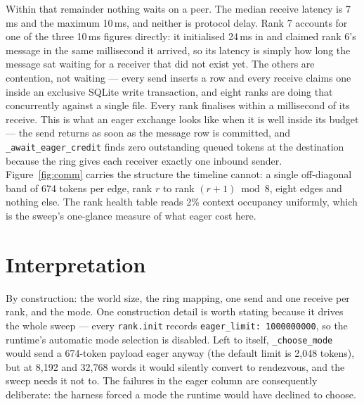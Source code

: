 \documentclass[11pt]{article}
\begin{document}
Within that remainder nothing waits on a peer. The median receive latency is 7\,ms
and the maximum 10\,ms, and neither is protocol delay. Rank 7 accounts for one of the
three 10\,ms figures directly: it initialised 24\,ms in and claimed rank 6's message
in the same millisecond it arrived, so its latency is simply how long the message sat
waiting for a receiver that did not exist yet. The others are contention, not
waiting --- every send inserts a row and every receive claims one inside an exclusive
SQLite write transaction, and eight ranks are doing that concurrently against a
single file. Every rank finalises within a millisecond of its receive. This is what
an eager exchange looks like when
it is well inside its budget --- the send returns as soon as the message row is
committed, and \texttt{\_await\_eager\_credit} finds zero outstanding queued tokens
at the destination because the ring gives each receiver exactly one inbound sender.
Figure~\ref{fig:comm} carries the structure the timeline cannot: a single
off-diagonal band of 674 tokens per edge, rank $r$ to rank $(r{+}1) \bmod 8$, eight
edges and nothing else. The rank health table reads 2\% context occupancy uniformly,
which is the sweep's one-glance measure of what eager cost here.

\section{Interpretation}

By construction: the world size, the ring mapping, one send and one receive per rank,
and the mode. One construction detail is worth stating because it drives the whole
sweep --- every \texttt{rank.init} records \texttt{eager\_limit: 1000000000}, so the
runtime's automatic mode selection is disabled. Left to itself,
\texttt{\_choose\_mode} would send a 674-token payload eager anyway (the default
limit is 2{,}048 tokens), but at 8{,}192 and 32{,}768 words it would silently convert
to rendezvous, and the sweep needs it not to. The failures in the eager column are
consequently deliberate: the harness forced a mode the runtime would have declined
to choose.
\end{document}

